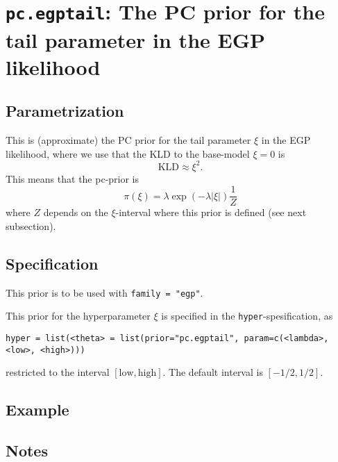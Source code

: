 \documentclass[a4paper,11pt]{article}
\begin{document}
\section*{\texttt{pc.egptail}: The PC prior for the tail parameter in
    the EGP likelihood}

\subsection*{Parametrization}

This is (approximate) the PC prior for the tail parameter $\xi$ in the
EGP likelihood, where we use that the KLD to the base-model $\xi=0$ is
\begin{displaymath}
    \text{KLD} \approx \xi^{2}.
\end{displaymath}
This means that the
pc-prior is
\begin{displaymath}
    \pi(\xi) = \lambda \exp(-\lambda |\xi|) \frac{1}{Z}
\end{displaymath}
where $Z$ depends on the $\xi$-interval where this prior is defined (see
next subsection).

\subsection*{Specification}
This prior is to be used with \texttt{family = "egp"}.

This prior for the hyperparameter $\xi$ is specified in the
\texttt{hyper}-spesification, as
\begin{center}
    \texttt{hyper = list(<theta> = list(prior="pc.egptail", param=c(<lambda>, <low>, <high>)))}
\end{center}
restricted to the interval $[\text{low}, \text{high}]$.  The
default interval is $[-1/2,1/2]$.

\subsection*{Example}

\subsection*{Notes}
\end{document}
